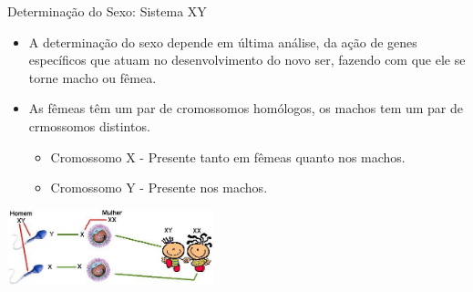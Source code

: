 \documentclass[]{beamer}
\begin{document}
  \begin{frame}{Determinação do Sexo: Sistema XY}
    \begin{center}
      \begin{itemize}
        \item A determinação do sexo depende em última análise, da ação de genes específicos que atuam no desenvolvimento do novo ser, fazendo com que ele se torne macho ou fêmea.
        \item As fêmeas têm um par de cromossomos homólogos, os machos tem um par de crmossomos distintos.
        \begin{itemize}
          \item Cromossomo X - Presente tanto em fêmeas quanto nos machos.
          \item Cromossomo Y - Presente nos machos.
        \end{itemize}
      \end{itemize}

      \hspace{0.5cm}

      \includegraphics[width=6cm]{images/xy.png}
    \end{center}
  \end{frame}
\end{document}
